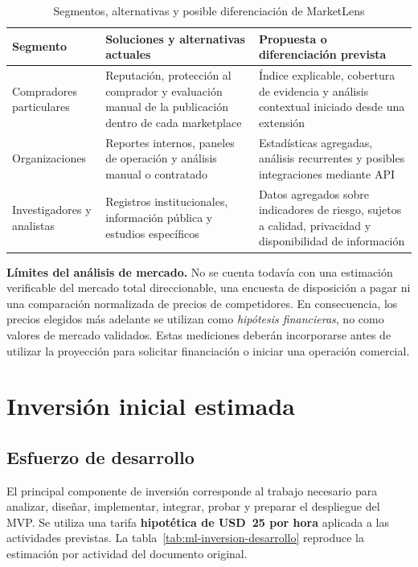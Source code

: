 \begin{table}[htbp]
\centering
\caption{Segmentos, alternativas y posible diferenciación de MarketLens}
\label{tab:ml-econ-segmentos}
\small
\begin{tabularx}{\textwidth}{@{}p{} X X@{}}
\toprule
\textbf{Segmento} & \textbf{Soluciones y alternativas actuales} & \textbf{Propuesta o diferenciación prevista} \\
\midrule
Compradores particulares & Reputación, protección al comprador y evaluación manual de la publicación dentro de cada marketplace & Índice explicable, cobertura de evidencia y análisis contextual iniciado desde una extensión \\
Organizaciones & Reportes internos, paneles de operación y análisis manual o contratado & Estadísticas agregadas, análisis recurrentes y posibles integraciones mediante API \\
Investigadores y analistas & Registros institucionales, información pública y estudios específicos & Datos agregados sobre indicadores de riesgo, sujetos a calidad, privacidad y disponibilidad de información \\
\bottomrule
\end{tabularx}
\end{table}

\textbf{Límites del análisis de mercado.} No se cuenta todavía con una estimación verificable del mercado total direccionable, una encuesta de disposición a pagar ni una comparación normalizada de precios de competidores. En consecuencia, los precios elegidos más adelante se utilizan como \textit{hipótesis financieras}, no como valores de mercado validados. Estas mediciones deberán incorporarse antes de utilizar la proyección para solicitar financiación o iniciar una operación comercial.

\section{Inversión inicial estimada}\label{sec:ml-inversion}

\subsection{Esfuerzo de desarrollo}

El principal componente de inversión corresponde al trabajo necesario para analizar, diseñar, implementar, integrar, probar y preparar el despliegue del MVP. Se utiliza una tarifa \textbf{hipotética de USD~25 por hora} aplicada a las actividades previstas. La tabla~\ref{tab:ml-inversion-desarrollo} reproduce la estimación por actividad del documento original.

